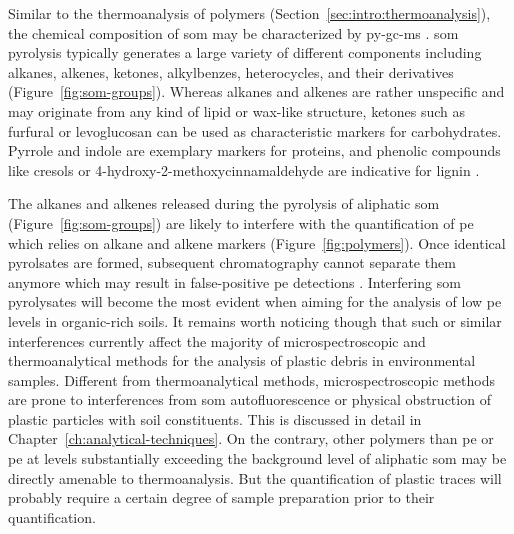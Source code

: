 Similar to the thermoanalysis of polymers (Section~\ref{sec:intro:thermoanalysis}), the chemical composition of \ac{som} may be characterized by \ac{py-gc-ms} \citep{CeccantiPyrolysisgas2007,HatcherModern2001}. \Ac{som} pyrolysis typically generates a large variety of different components including alkanes, alkenes, ketones, alkylbenzes, heterocycles, and their derivatives (Figure~\ref{fig:som-groups}). Whereas alkanes and alkenes are rather unspecific and may originate from any kind of lipid or wax-like structure, ketones such as furfural or levoglucosan can be used as characteristic markers for carbohydrates. Pyrrole and indole are exemplary markers for proteins, and phenolic compounds like cresols or 4-hydroxy-2-methoxycinnamaldehyde are indicative for lignin \citep[Figure~\ref{fig:som-groups};][]{HatcherModern2001}.

The alkanes and alkenes released during the pyrolysis of aliphatic \ac{som} (Figure~\ref{fig:som-groups}) are likely to interfere with the quantification of \ac{pe} which relies on alkane and alkene markers (Figure~\ref{fig:polymers}). Once identical pyrolsates are formed, subsequent chromatography cannot separate them anymore which may result in false-positive \ac{pe} detections \citep{DumichenAnalysis2015}. Interfering \ac{som} pyrolysates will become the most evident when aiming for the analysis of low \ac{pe} levels in organic-rich soils.
It remains worth noticing though that such or similar interferences currently affect the majority of microspectroscopic and thermoanalytical methods for the analysis of plastic debris in environmental samples. Different from thermoanalytical methods, microspectroscopic methods are prone to interferences from \ac{som} autofluorescence or physical obstruction of plastic particles with soil constituents. This is discussed in detail in Chapter~\ref{ch:analytical-techniques}.
On the contrary, other polymers than \ac{pe} or \ac{pe} at levels substantially exceeding the background level of aliphatic \ac{som} may be directly amenable to thermoanalysis. But the quantification of plastic traces will probably require a certain degree of sample preparation prior to their quantification.

